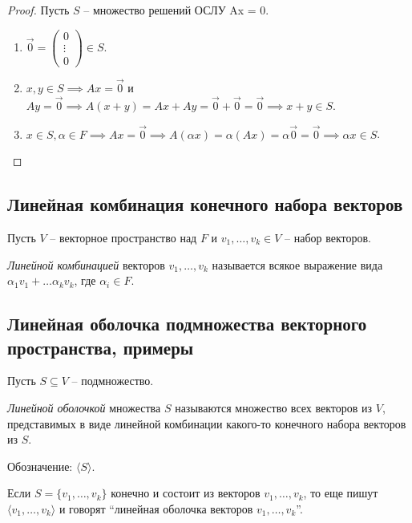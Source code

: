 \begin{proof}
    Пусть $S$ -- множество решений ОСЛУ Ax = 0.
    \begin{enumerate}
        \item $\overrightarrow{0} = \begin{pmatrix} 0 \\ \vdots \\ 0 \end{pmatrix} \in S$.
        \item $x, y \in S \implies Ax = \overrightarrow{0}$ и $Ay = \overrightarrow{0} \implies A(x + y) = Ax + Ay = \overrightarrow{0} + \overrightarrow{0} = \overrightarrow{0} \implies x + y \in S$.
        \item $x \in S, \alpha \in F \implies Ax = \overrightarrow{0} \implies A(\alpha x) = \alpha (Ax) = \alpha \overrightarrow{0} = \overrightarrow{0} \implies \alpha x \in S$. \qedhere
    \end{enumerate}
\end{proof}


\subsection{Линейная комбинация конечного набора векторов}

Пусть $V$ -- векторное пространство над $F$ и $v_1, \dots, v_k \in V$ -- набор векторов.

\begin{definition}
    \textit{Линейной комбинацией} векторов $v_1, \dots, v_k$ называется всякое выражение вида $\alpha_1 v_1 + \dots \alpha_k v_k$, где $\alpha_i \in F$.
\end{definition}

\subsection{Линейная оболочка подмножества векторного пространства, примеры}

Пусть $S \subseteq V$ -- подмножество.

\begin{definition}
    \textit{Линейной оболочкой} множества $S$ называются множество всех векторов из $V$, представимых в виде линейной комбинации какого-то конечного набора векторов из $S$.

    Обозначение: $\langle S \rangle$.
\end{definition}

Если $S = \{v_1, \dots, v_k\}$ конечно и состоит из векторов $v_1, \dots, v_k$, то еще пишут $\langle v_1, \dots, v_k \rangle$ и говорят ``линейная оболочка векторов $v_1, \dots, v_k$''.

